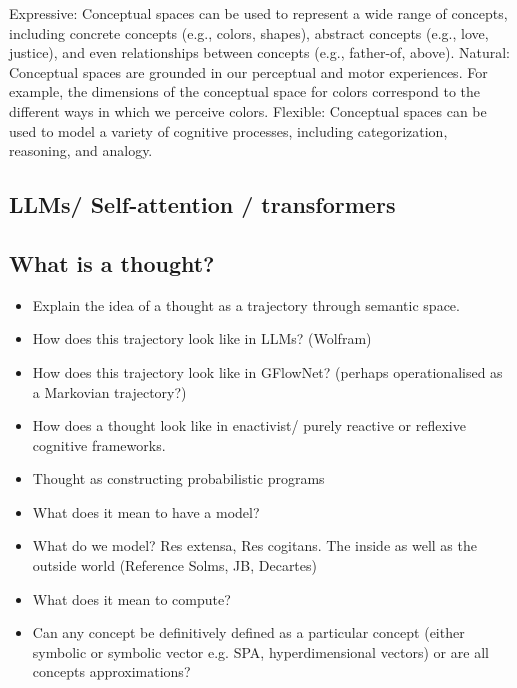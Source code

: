 Expressive: Conceptual spaces can be used to represent a wide range of concepts, including concrete concepts (e.g., colors, shapes), abstract concepts (e.g., love, justice), and even relationships between concepts (e.g., father-of, above).
Natural: Conceptual spaces are grounded in our perceptual and motor experiences. For example, the dimensions of the conceptual space for colors correspond to the different ways in which we perceive colors.
Flexible: Conceptual spaces can be used to model a variety of cognitive processes, including categorization, reasoning, and analogy.



\subsection{LLMs/ Self-attention / transformers}


\subsection{What is a thought?}
\begin{itemize}
    \item Explain the idea of a thought as a trajectory through semantic space. 
    \item How does this trajectory look like in LLMs? (Wolfram)
    \item How does this trajectory look like in GFlowNet? (perhaps operationalised as a Markovian trajectory?)
    \item How does a thought look like in enactivist/ purely reactive or reflexive cognitive frameworks. 
    \item Thought as constructing probabilistic programs
    \item What does it mean to have a model?
    \item What do we model? Res extensa, Res cogitans. The inside as well as the outside world (Reference Solms, JB, Decartes)
    \item What does it mean to compute?
    \item Can any concept be definitively defined as a particular concept (either symbolic or symbolic vector e.g. SPA, hyperdimensional vectors) or are all concepts approximations?
\end{itemize}

